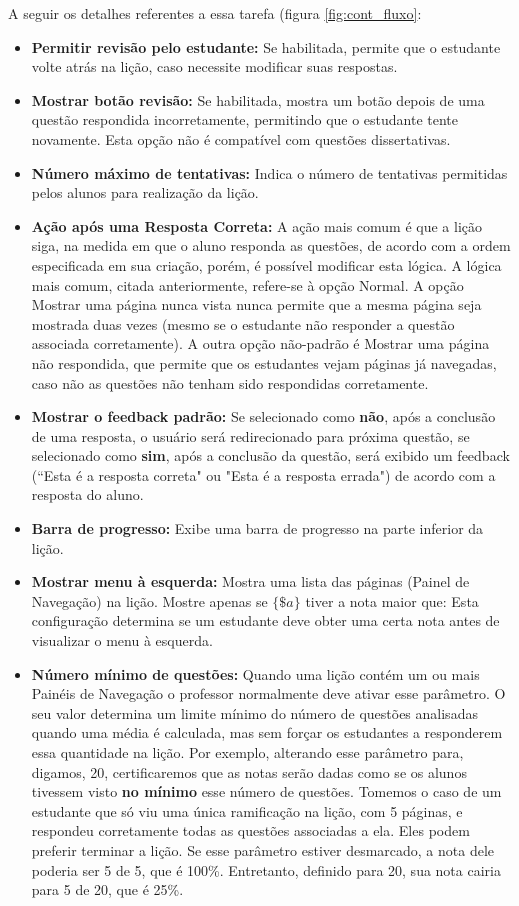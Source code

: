 A seguir os detalhes referentes a essa tarefa (figura \ref{fig:cont_fluxo}:

\begin{itemize}
 \item \textbf{Permitir revisão pelo estudante:} Se habilitada, permite que o estudante volte atrás na lição, caso necessite modificar suas respostas.
 \item \textbf{Mostrar botão revisão:} Se habilitada, mostra um botão depois de uma questão respondida incorretamente, permitindo que o estudante tente novamente. Esta opção não é compatível com questões dissertativas.
 \item \textbf{Número máximo de tentativas:} Indica o número de tentativas permitidas pelos alunos para realização da lição.
 \item \textbf{Ação após uma Resposta Correta:} A ação mais comum é que a lição siga, na medida em que o aluno responda as questões, de acordo com a ordem especificada em sua criação, porém, é possível modificar esta lógica. A lógica mais comum, citada anteriormente, refere-se à opção Normal. A opção Mostrar uma página nunca vista nunca permite que a mesma página seja mostrada duas vezes (mesmo se o estudante não responder a questão associada corretamente). A outra opção não-padrão é Mostrar uma página não respondida, que permite que os estudantes vejam páginas já navegadas, caso não as questões não tenham sido respondidas corretamente.
 \item \textbf{Mostrar o feedback padrão:} Se selecionado como \textbf{não}, após a conclusão de uma resposta, o usuário será redirecionado para próxima questão, se selecionado como \textbf{sim}, após a conclusão da questão, será exibido um feedback (“Esta é a resposta correta" ou "Esta é a resposta errada") de acordo com a resposta do aluno.
 \item \textbf{Barra de progresso:} Exibe uma barra de progresso na parte inferior da lição.
 \item \textbf{Mostrar menu à esquerda:} Mostra uma lista das páginas (Painel de Navegação) na lição. Mostre apenas se $\{\$a\}$ tiver a nota maior que: Esta configuração determina se um estudante deve obter uma certa nota antes de visualizar o menu à esquerda.
 \item \textbf{Número mínimo de questões:} Quando uma lição contém um ou mais Painéis de Navegação o professor normalmente deve ativar esse parâmetro. O seu valor determina um limite mínimo do número de questões analisadas quando uma média é calculada, mas sem forçar os estudantes a responderem essa quantidade na lição. Por exemplo, alterando esse parâmetro para, digamos, 20, certificaremos que as notas serão dadas como se os alunos tivessem visto \textbf{no mínimo} esse número de questões. Tomemos o caso de um estudante que só viu uma única ramificação na lição, com 5 páginas, e respondeu corretamente todas as questões associadas a ela. Eles podem preferir terminar a lição. Se esse parâmetro estiver desmarcado, a nota dele poderia ser 5 de 5, que é 100\%. Entretanto, definido para 20, sua nota cairia para 5 de 20, que é 25\%.

\end{itemize}
